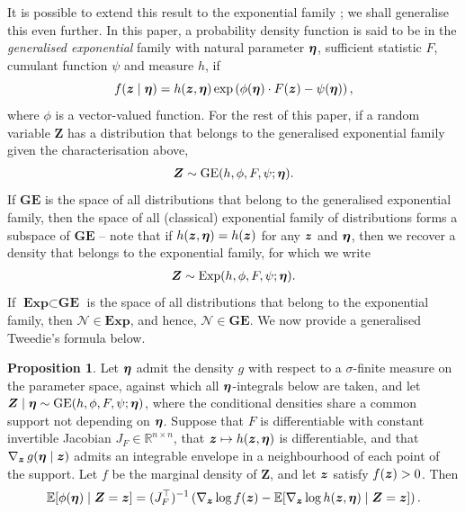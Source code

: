 \documentclass{article}
\def\R{\mathbb{R}}
\def\E{\mathbb{E}}
\def\tp{\top}
\theoremstyle{definition}
\newtheorem{proposition}{Proposition}[section]
\begin{document}
It is possible to extend this result to the exponential family \cite{efron_tweedies_2011}; we shall generalise this even further. In this paper, a probability density function is said to be in the \emph{generalised exponential} family with natural parameter $\boldsymbol{\eta}$, sufficient statistic $F$, cumulant function $\psi$ and measure $h$, if
\begin{equation}\label{eq:exp_family}
    f(\boldsymbol{z} \mid \boldsymbol{\eta}) = h(\boldsymbol{z}, \boldsymbol{\eta})\exp\left( \phi(\boldsymbol{\eta}) \cdot F(\boldsymbol{z}) - \psi(\boldsymbol{\eta})\right),
\end{equation}
where $\phi$ is a vector-valued function. For the rest of this paper, if a random variable $\boldsymbol{Z}$ has a distribution that belongs to the generalised exponential family given the characterisation above,
\begin{align}
\boldsymbol{Z} \sim \text{GE}(h, \phi, F, \psi ; \boldsymbol{\eta}). \notag
\end{align}
If $\textbf{GE}$ is the space of all distributions that belong to the generalised exponential family, then the space of all (classical) exponential family of distributions forms a subspace of $\textbf{GE}$ -- note that if $h(\boldsymbol{z}, \boldsymbol{\eta}) = h(\boldsymbol{z})$ for any $\boldsymbol{z}$ and $\boldsymbol{\eta}$, then we recover a density that belongs to the  exponential family, for which we write
\begin{align}
\boldsymbol{Z} \sim \text{Exp}(h, \phi, F, \psi ; \boldsymbol{\eta}). \notag
\end{align}
If $\textbf{Exp} \subset \textbf{GE}$ is the space of all distributions that belong to the exponential family, then $\mathcal{N} \in \textbf{Exp}$, and hence, $\mathcal{N} \in \textbf{GE}$. We now provide a generalised Tweedie's formula below.

\begin{proposition}\label{prop:tweedie_gen}
    Let $\boldsymbol{\eta}$ admit the density $g$ with respect to a $\sigma$-finite measure on the parameter space, against which all $\boldsymbol{\eta}$-integrals below are taken, and let $\boldsymbol{Z} \mid \boldsymbol{\eta} \sim \text{GE}(h, \phi, F, \psi ; \boldsymbol{\eta})$, where the conditional densities share a common support not depending on $\boldsymbol{\eta}$. Suppose that $F$ is differentiable with constant invertible Jacobian $J_F \in \R^{n \times n}$, that $\boldsymbol{z} \mapsto h(\boldsymbol{z}, \boldsymbol{\eta})$ is differentiable, and that $\nabla_{\boldsymbol{z}}\, g(\boldsymbol{\eta} \mid \boldsymbol{z})$ admits an integrable envelope in a neighbourhood of each point of the support. Let $f$ be the marginal density of $\boldsymbol{Z}$, and let $\boldsymbol{z}$ satisfy $f(\boldsymbol{z}) > 0$. Then
    \begin{equation*}
        \mathbb{E}[\phi(\bfeta) \mid \boldsymbol{Z} = \boldsymbol{z}] = (J_F^{\tp})^{-1}\left(\nabla_{\bfz} \log f(\bfz) - \E[\nabla_{\bfz} \log h(\bfz,\bfeta) \mid \boldsymbol{Z} = \boldsymbol{z} ]\right).
    \end{equation*}
\end{proposition}
\end{document}

